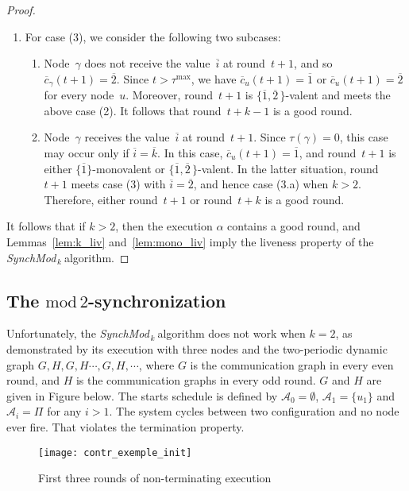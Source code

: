 \documentclass{article}
\newcommand{\cent}{\gamma}
\newcommand{\try}{\tau}
\newcommand{\SM}{{\em SynchMod}$_{\,k}\ $}
\begin{document}
\begin{proof}
\begin{enumerate}
\item For case (3),  we consider the following two subcases:
\begin{enumerate}
\item Node~$\cent$ does not receive the value~$ \overline{i} $ at round~$t+1$, and so $ \overline{c}_{\cent}(t + 1)  = \overline{ 2 } $.
Since  $t> \try^{\max} $, we have $  \overline{c}_{u}(t + 1)  = \overline{ 1 } $ or $  \overline{c}_{u}(t + 1)  = \overline{ 2 } $ 
	for every node~$u$.
Moreover, round~$t+1$ is $ \{\overline{1} , \overline{2} \, \}$-valent and meets the above case (2).
It follows that round~$t +k-1$ is a good round.
\item Node~$\cent$ receives the value~$ \overline{i} $ at round~$t+1$.
Since $\try(\cent)= 0$, this case may occur only if $ \overline{i } = \overline{ k }$.
In this case, $  \overline{c}_{u}(t + 1)  = \overline{ 1 } $, and round~$t+1$ is either 
	$ \{\overline{1}\}$-monovalent or  $ \{\overline{1} , \overline{2} \, \}$-valent.
In the latter situation,  round~$t+1$ meets case (3) with $\overline{i}  =\overline{2} $, and hence case (3.a) when  $k>2$.
Therefore, either round~$t+1$ or round~$t+k$ is a good round.
\end{enumerate}
\end{enumerate}
It follows that if $k>2$, then the execution $\alpha$ contains a good round, and
	Lemmas~\ref{lem:k_liv} and~\ref{lem:mono_liv} imply the liveness property of the \SM algorithm.
\end{proof}

\subsection{The $\mathrm{mod}\,2$-synchronization}\label{sec:k=2}

Unfortunately, the \SM algorithm does not work when $k=2$, as demonstrated by its execution 
	with three nodes and the two-periodic dynamic graph 
	$G,H,G,H \cdots, G, H, \cdots$, where $G$ is the communication graph in every even round, and $H$ is the communication graphs in every odd round.
	$G$ and $H$ are given in Figure below.
	The starts schedule is defined by $\mathcal{A}_0 = \emptyset$, $\mathcal{A}_1 = \{u_1\}$ and $\mathcal{A}_i = \Pi$ for any $i>1$.
	The system cycles between two configuration and no node ever fire. That violates the termination property. 
	
\begin{figure}[h]
	\centering
	\texttt{[image: contr\_exemple\_init]}
	\caption{First three rounds of non-terminating execution}
\end{figure}
\end{document}
